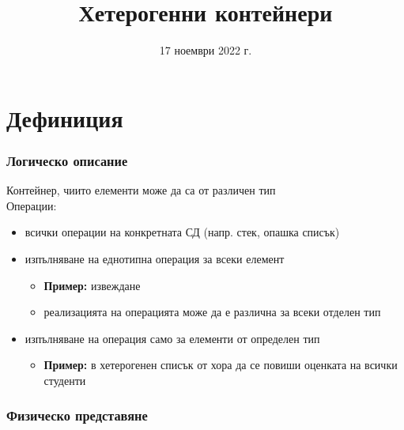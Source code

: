 \documentclass[alsotrans]{beamerswitch}
\title{Хетерогенни контейнери}
\date{17 ноември 2022 г.}
\begin{document}
\begin{frame}
  \titlepage
\end{frame}

\section{Дефиниция}

\begin{frame}
  \frametitle{Логическо описание}
  Контейнер, чиито елементи може да са от различен тип\\[2ex]
  Операции:
  \begin{itemize}
  \item всички операции на конкретната СД (напр. стек, опашка списък)
  \item изпълняване на еднотипна операция за всеки елемент
    \begin{itemize}
    \item \textbf{Пример:} извеждане
    \item реализацията на операцията може да е различна за всеки отделен тип
    \end{itemize}
  \item изпълняване на операция само за елементи от определен тип
    \begin{itemize}
    \item \textbf{Пример:} в хетерогенен списък от хора да се повиши оценката на всички студенти
    \end{itemize}
  \end{itemize}
\end{frame}

\begin{frame}
  \frametitle{Физическо представяне}
  \begin{center}
    \scriptsize
  \end{center}
\end{frame}
\end{document}
